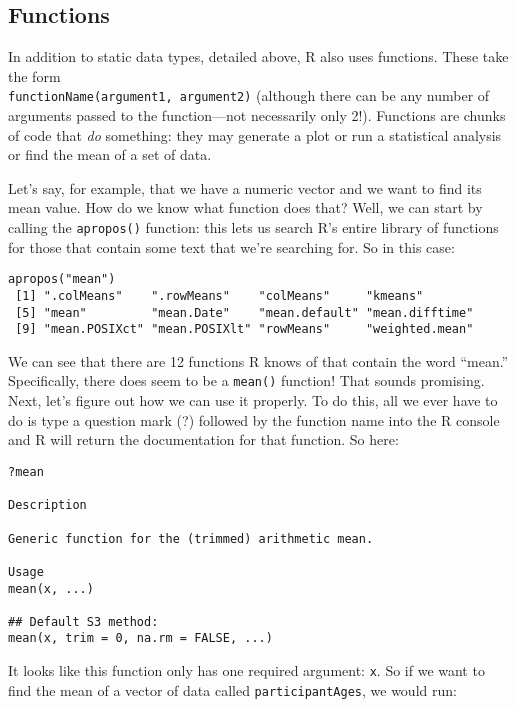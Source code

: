 \subsection{Functions}
In addition to static data types, detailed above, R also uses functions. These take the form \\\verb|functionName(argument1, argument2)| (although there can be any number of arguments passed to the function---not necessarily only 2!). Functions are chunks of code that \textit{do} something: they may generate a plot or run a statistical analysis or find the mean of a set of data.

Let's say, for example, that we have a numeric vector and we want to find its mean value. How do we know what function does that? Well, we can start by calling the \verb|apropos()| function: this lets us search R's entire library of functions for those that contain some text that we're searching for. So in this case:

\begin{framed}
\begin{Verbatim}[samepage=TRUE]
apropos("mean")
 [1] ".colMeans"    ".rowMeans"    "colMeans"     "kmeans"
 [5] "mean"         "mean.Date"    "mean.default" "mean.difftime"
 [9] "mean.POSIXct" "mean.POSIXlt" "rowMeans"     "weighted.mean"
\end{Verbatim}
\end{framed}

We can see that there are 12 functions R knows of that contain the word ``mean.'' Specifically, there does seem to be a \verb|mean()| function! That sounds promising. Next, let's figure out how we can use it properly. To do this, all we ever have to do is type a question mark (?) followed by the function name into the R console and R will return the documentation for that function. So here:

\begin{framed}
\begin{Verbatim}[samepage=TRUE]
?mean

Description

Generic function for the (trimmed) arithmetic mean.

Usage
mean(x, ...)

## Default S3 method:
mean(x, trim = 0, na.rm = FALSE, ...)
\end{Verbatim}
\end{framed}

It looks like this function only has one required argument: \verb|x|. So if we want to find the mean of a vector of data called \verb|participantAges|, we would run:


